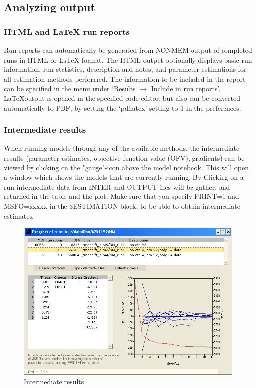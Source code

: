 \documentclass[a4,11pt]{report} \usepackage[pdftex]{graphicx}
\begin{document}
{{\subsection{Analyzing output}

\subsubsection*{HTML and \LaTeX \hspace{2pt} run reports} Run reports
can automatically be generated from NONMEM output of completed runs in
HTML or \LaTeX \hspace{2pt} format. The HTML output optionally
displays basic run information, run statistics, description and notes,
and parameter estimations for all estimation methods performed. The
information to be included in the report can be specified in the menu
under `Results $\rightarrow$ Include in run reports'. \LaTeX output is
opened in the specified code editor, but also can be converted
automatically to PDF, by setting the `pdflatex' setting to 1 in the
preferences.

\subsubsection*{Intermediate results} When running models through any
of the available methods, the intermediate results (parameter
estimates, objective function value (OFV), gradients) can be viewed by
clicking on the "gauge"-icon above the model notebook. This will open
a window which shows the models that are currently running. By
Clicking on a run intermediate data from INTER and OUTPUT files will
be gather, and returned in the table and the plot. Make sure that you
specify PRINT=1 and MSFO=xxxxx in the \$ESTIMATION block, to be able
to obtain intermediate estimates.

\begin{figure}[hbt] \centering
    \includegraphics[scale=0.3]{images/intermed.png}
    \caption{Intermediate results}
\end{figure}

}}
\end{document}
